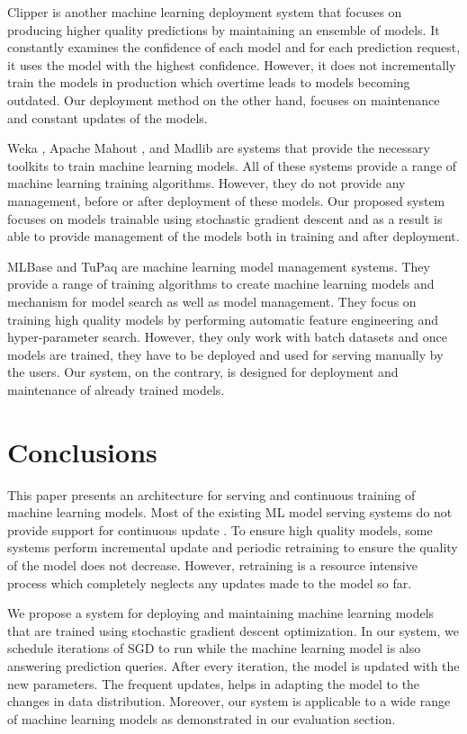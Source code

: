 \documentclass{vldb}
\begin{document}
Clipper \cite{crankshaw2016clipper} is another machine learning deployment system that focuses on producing higher quality predictions by maintaining an ensemble of models.
It constantly examines the confidence of each model and for each prediction request, it uses the model with the highest confidence.
However, it does not incrementally train the models in production which overtime leads to models becoming outdated.
Our deployment method on the other hand, focuses on maintenance and constant updates of the models.

Weka \cite{hall2009weka}, Apache Mahout \cite{Owen:2011:MA:2132656}, and Madlib \cite{hellerstein2012madlib} are systems that provide the necessary toolkits to train machine learning models. All of these systems provide a range of machine learning training algorithms. 
However, they do not provide any management, before or after deployment of these models. 
Our proposed system focuses on models trainable using stochastic gradient descent and as a result is able to provide management of the models both in training and after deployment.

MLBase \cite{kraska2013mlbase} and TuPaq \cite{sparks2015tupaq} are machine learning model management systems.
They provide a range of training algorithms to create machine learning models and mechanism for model search as well as model management.
They focus on training high quality models by performing automatic feature engineering and hyper-parameter search.
However, they only work with batch datasets and once models are trained, they have to be deployed and used for serving manually by the users.
Our system, on the contrary, is designed for deployment and maintenance of already trained models.


\section{Conclusions} \label{conclusion}
This paper presents an architecture for serving and continuous training of machine learning models.
Most of the existing ML model serving systems do not provide support for continuous update \cite{abadi2016tensorflow,crankshaw2016clipper}.
To ensure high quality models, some systems \cite{crankshaw2014missing} perform incremental update and periodic retraining to ensure the quality of the model does not decrease.
However, retraining is a resource intensive process which completely neglects any updates made to the model so far.

We propose a system for deploying and maintaining machine learning models that are trained using stochastic gradient descent optimization.
In our system, we schedule iterations of SGD to run while the machine learning model is also answering prediction queries.
After every iteration, the model is updated with the new parameters.
The frequent updates, helps in adapting the model to the changes in data distribution.
Moreover, our system is applicable to a wide range of machine learning models as demonstrated in our evaluation section.
\end{document}
